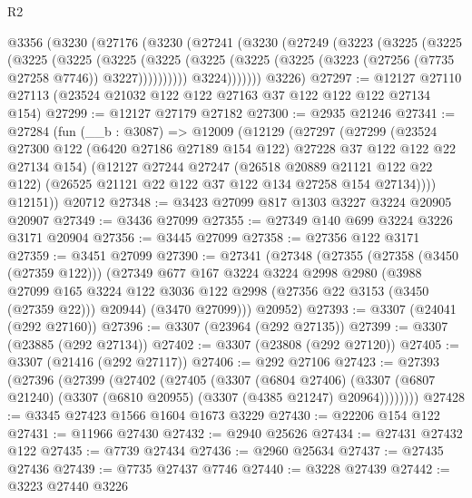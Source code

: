 \begin{lexlean}{R2}
\begin{coremodule}
    @3356
      (@3230
        (@27176
          (@3230
            (@27241
              (@3230
                (@27249
                  (@3223
                    (@3225
                      (@3225
                        (@3225
                          (@3225
                            (@3225
                              (@3225
                                (@3225
                                  (@3225 (@3225 (@3223 (@27256 (@7735 @27258 @7746)) @3227))))))))))
                    @3224)))))))
      @3226)
@27297 := @12127 @27110 @27113 (@23524 @21032 @122 @122 @27163 @37 @122 @122 @122 @27134 @154)
@27299 := @12127 @27179 @27182
@27300 := @2935 @21246
@27341 := @27284
    (fun (__b : @3087) =>
    @12009
      (@12129
        (@27297
          (@27299
            (@23524
              @27300
              @122
              (@6420 @27186 @27189 @154 @122)
              @27228
              @37
              @122
              @122
              @22
              @27134
              @154)
            (@12127
              @27244
              @27247
              (@26518 @20889 @21121 @122 @22 @122)
              (@26525 @21121 @22 @122 @37 @122 @134 @27258 @154 @27134))))
        @12151))
    @20712
@27348 := @3423 @27099 @817 @1303 @3227 @3224 @20905 @20907
@27349 := @3436 @27099
@27355 := @27349 @140 @699 @3224 @3226 @3171 @20904
@27356 := @3445 @27099
@27358 := @27356 @122 @3171
@27359 := @3451 @27099
@27390 := @27341
    (@27348
      (@27355
        (@27358 (@3450 (@27359 @122)))
        (@27349
          @677
          @167
          @3224
          @3224
          @2998
          @2980
          (@3988
            @27099
            @165
            @3224
            @122
            @3036
            @122
            @2998
            (@27356 @22 @3153 (@3450 (@27359 @22)))
            @20944)
          (@3470 @27099)))
      @20952)
@27393 := @3307 (@24041 (@292 @27160))
@27396 := @3307 (@23964 (@292 @27135))
@27399 := @3307 (@23885 (@292 @27134))
@27402 := @3307 (@23808 (@292 @27120))
@27405 := @3307 (@21416 (@292 @27117))
@27406 := @292 @27106
@27423 := @27393
    (@27396
      (@27399
        (@27402
          (@27405
            (@3307
              (@6804 @27406)
              (@3307 (@6807 @21240) (@3307 (@6810 @20955) (@3307 (@4385 @21247) @20964))))))))
@27428 := @3345 @27423 @1566 @1604 @1673 @3229
@27430 := @22206 @154 @122
@27431 := @11966 @27430
@27432 := @2940 @25626
@27434 := @27431 @27432 @122
@27435 := @7739 @27434
@27436 := @2960 @25634
@27437 := @27435 @27436
@27439 := @7735 @27437 @7746
@27440 := @3228 @27439
@27442 := @3223 @27440 @3226

\end{coremodule}
\end{lexlean}
